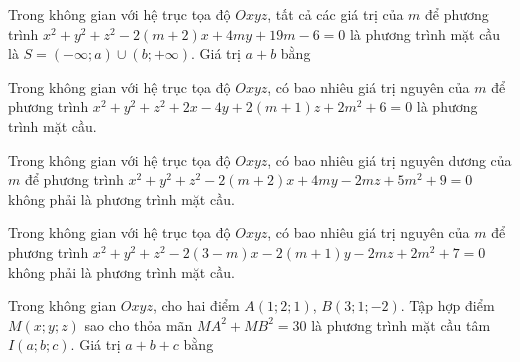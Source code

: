 \begin{ex}%
	Trong không gian với hệ trục tọa độ $Oxyz$, tất cả các giá trị của $m$ để phương trình $x^2+y^2+z^2-2(m+2)x+4my+19m-6=0$ là phương trình mặt cầu là $S=(-\infty;a)\cup(b;+\infty)$. Giá trị $a+b$ bằng
\end{ex}
\begin{ex}%
	Trong không gian với hệ trục tọa độ $Oxyz$, có bao nhiêu giá trị nguyên của $m$ để phương trình $x^2+y^2+z^2+2x-4y+2(m+1)z+2m^2+6=0$ là phương trình mặt cầu.
\end{ex}
\begin{ex}%
	Trong không gian với hệ trục tọa độ $Oxyz$, có bao nhiêu giá trị nguyên dương của $m$ để phương trình $x^2+y^2+z^2-2(m+2)x+4my-2mz+5m^2+9=0$ không phải là phương trình mặt cầu.
\end{ex}
\begin{ex}%
	Trong không gian với hệ trục tọa độ $Oxyz$, có bao nhiêu giá trị nguyên của $m$ để phương trình $x^2+y^2+z^2-2(3-m)x-2(m+1)y-2mz+2m^2+7=0$ không phải là phương trình mặt cầu.
\end{ex}
\begin{ex}%
	Trong không gian $Oxyz$, cho hai điểm $A(1;2;1)$, $B(3;1;-2)$. Tập hợp điểm $M(x;y;z)$ sao cho thỏa mãn $MA^2+MB^2=30$ là phương trình mặt cầu tâm $I(a;b;c)$. Giá trị $a+b+c$ bằng
\end{ex}
